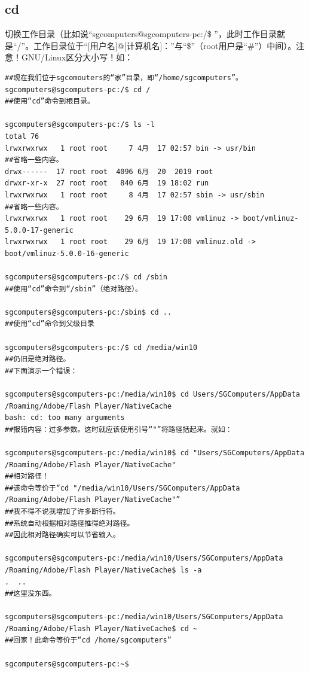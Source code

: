 \subsection{cd}
\label{sec:cd}切换工作目录（比如说“sgcomputers@sgcomputers-pc:/\$ ”，此时工作目录就是“/”。工作目录位于“[用户名]@[计算机名]：”与“\$”（root用户是“\#”）中间）。{\color{red}注意！GNU/Linux区分大小写！}如：
\begin{verbatim}
##现在我们位于sgcomouters的“家”目录，即“/home/sgcomputers”。
sgcomputers@sgcomputers-pc:/$ cd /
##使用“cd”命令到根目录。

sgcomputers@sgcomputers-pc:/$ ls -l
total 76
lrwxrwxrwx   1 root root     7 4月  17 02:57 bin -> usr/bin
##省略一些内容。
drwx------  17 root root  4096 6月  20  2019 root
drwxr-xr-x  27 root root   840 6月  19 18:02 run
lrwxrwxrwx   1 root root     8 4月  17 02:57 sbin -> usr/sbin
##省略一些内容。
lrwxrwxrwx   1 root root    29 6月  19 17:00 vmlinuz -> boot/vmlinuz-5.0.0-17-generic
lrwxrwxrwx   1 root root    29 6月  19 17:00 vmlinuz.old -> boot/vmlinuz-5.0.0-16-generic

sgcomputers@sgcomputers-pc:/$ cd /sbin
##使用“cd”命令到“/sbin”（绝对路径）。

sgcomputers@sgcomputers-pc:/sbin$ cd ..
##使用“cd”命令到父级目录

sgcomputers@sgcomputers-pc:/$ cd /media/win10
##仍旧是绝对路径。
##下面演示一个错误：

sgcomputers@sgcomputers-pc:/media/win10$ cd Users/SGComputers/AppData
/Roaming/Adobe/Flash Player/NativeCache
bash: cd: too many arguments
##报错内容：过多参数。这时就应该使用引号“"”将路径括起来。就如：

sgcomputers@sgcomputers-pc:/media/win10$ cd "Users/SGComputers/AppData
/Roaming/Adobe/Flash Player/NativeCache"
##相对路径！
##该命令等价于“cd "/media/win10/Users/SGComputers/AppData
/Roaming/Adobe/Flash Player/NativeCache"”
##我不得不说我增加了许多断行符。
##系统自动根据相对路径推得绝对路径。
##因此相对路径确实可以节省输入。

sgcomputers@sgcomputers-pc:/media/win10/Users/SGComputers/AppData
/Roaming/Adobe/Flash Player/NativeCache$ ls -a
.  ..
##这里没东西。

sgcomputers@sgcomputers-pc:/media/win10/Users/SGComputers/AppData
/Roaming/Adobe/Flash Player/NativeCache$ cd ~
##回家！此命令等价于“cd /home/sgcomputers”

sgcomputers@sgcomputers-pc:~$ 
\end{verbatim}
